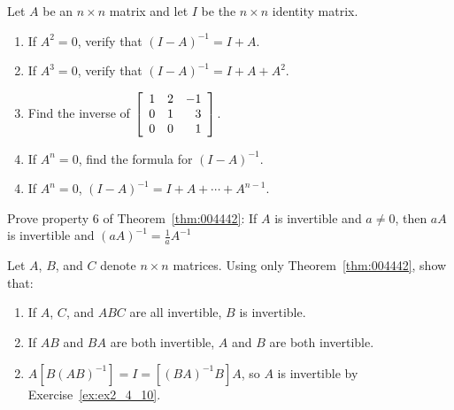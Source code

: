 \begin{multicols}{2}
\begin{ex}
Let $A$ be an $n \times n$ matrix and let $I$ be the $n \times n$ identity matrix.


\begin{enumerate}[label={\alph*.}]
\item If $A^{2} = 0$, verify that $(I - A)^{-1} = I + A$.

\item If $A^{3} = 0$, verify that $(I - A)^{-1} = I + A + A^{2}$.

\item Find the inverse of $\left[ \begin{array}{rrr}
1 & 2 & -1 \\
0 & 1 & 3 \\
0 & 0 & 1
\end{array} \right]$.

\item If $A^{n} = 0$, find the formula for $(I - A)^{-1}$.

\end{enumerate}
\begin{sol}
\begin{enumerate}[label={\alph*.}]
\setcounter{enumi}{3}
\item If $A^{n} = 0$, $(I - A)^{-1} = I + A + \cdots + A^{n-1}$.

\end{enumerate}
\end{sol}
\end{ex}

\begin{ex} \label{ex:ex2_4_29}
Prove property 6 of Theorem~\ref{thm:004442}: If $A$ is invertible and $a \neq 0$, then $aA$ is invertible and $(aA)^{-1} = \frac{1}{a}A^{-1}$
\end{ex}

\begin{ex}
Let $A$, $B$, and $C$ denote $n \times n$ matrices. Using only Theorem~\ref{thm:004442}, show that:


\begin{enumerate}[label={\alph*.}]
\item If $A$, $C$, and $ABC$ are all invertible, $B$ is invertible.

\item If $AB$ and $BA$ are both invertible, $A$ and $B$ are both invertible.

\end{enumerate}
\begin{sol}
\begin{enumerate}[label={\alph*.}]
\setcounter{enumi}{1}
\item  $A[B(AB)^{-1}] = I = [(BA)^{-1}B]A$, so $A$ is invertible by Exercise~\ref{ex:ex2_4_10}.



\end{enumerate}
\end{sol}
\end{ex}
\end{multicols}
